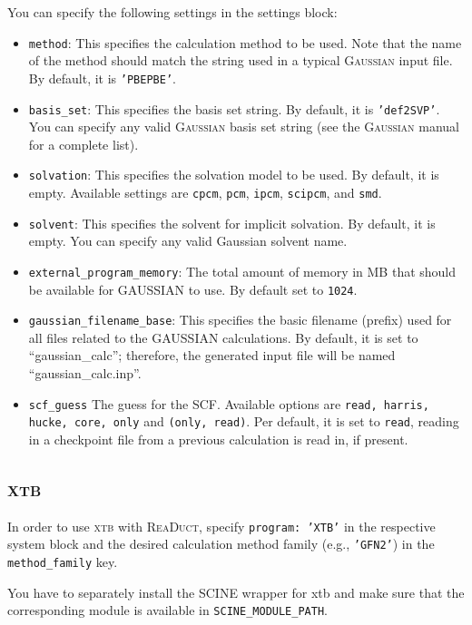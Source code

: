 \documentclass[]{tufte-book}
\begin{document}
You can specify the following settings in the settings block:
\begin{itemize}
\item \texttt{method}:
This specifies the calculation method to be used.
Note that the name of the method should match the string used in a typical \textsc{Gaussian} input file.
By default, it is \texttt{'PBEPBE'}.
\item \texttt{basis\_set}: This specifies the basis set string. By default, it is \texttt{'def2SVP'}. You can specify
any valid \textsc{Gaussian} basis set string (see the \textsc{Gaussian} manual for a complete list).
\item \texttt{solvation}: This specifies the solvation model to be used. By default, it is empty. Available settings are \texttt{cpcm}, \texttt{pcm}, \texttt{ipcm}, \texttt{scipcm},
and \texttt{smd}.
\item \texttt{solvent}: This specifies the solvent for implicit solvation. By default, it is empty. You can specify any valid Gaussian solvent name.
\item \texttt{external\_program\_memory}: The total amount of memory in MB that should be available for GAUSSIAN to use.
By default set to \texttt{1024}.
\item \texttt{gaussian\_filename\_base}: This specifies the basic filename (prefix) used for all files related to the GAUSSIAN calculations.
By default, it is set to ``gaussian\_calc''; therefore, the generated input file will be named ``gaussian\_calc.inp''.
\item \texttt{scf\_guess} The guess for the SCF. Available options are \texttt{read, harris, hucke, core, only} and \texttt{(only, read)}. Per default, it is set to \texttt{read}, reading in a checkpoint file from a previous calculation is read in, if present.
\end{itemize}

\subsection{\textsc{xtb}}

In order to use \textsc{xtb} with \textsc{ReaDuct}, specify \texttt{program: 'XTB'} in the respective system block and the desired
calculation method family (e.g., \texttt{'GFN2'}) in the \texttt{method\_family} key.

You have to separately install the SCINE wrapper for xtb and make sure that the corresponding module is available in \texttt{SCINE\_MODULE\_PATH}.
\end{document}
